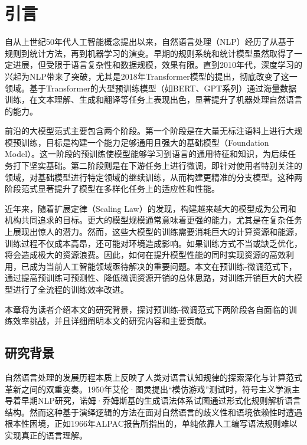 
\chapter{引言}

自从上世纪50年代人工智能概念提出以来，自然语言处理（NLP）经历了从基于规则到统计方法，再到机器学习的演变。早期的规则系统和统计模型虽然取得了一定进展，但受限于语言复杂性和数据规模，效果有限。直到2010年代，深度学习的兴起为NLP带来了突破，尤其是2018年Transformer模型的提出，彻底改变了这一领域。基于Transformer的大型预训练模型（如BERT、GPT系列）通过海量数据训练，在文本理解、生成和翻译等任务上表现出色，显著提升了机器处理自然语言的能力。


前沿的大模型范式主要包含两个阶段。第一个阶段是在大量无标注语料上进行大规模预训练，目标是构建一个能力足够通用且强大的基础模型（Foundation Model）。这一阶段的预训练使模型能够学习到语言的通用特征和知识，为后续任务打下坚实基础。第二阶段则是在下游任务上进行微调，即针对使用者特别关注的领域，对基础模型进行特定领域的继续训练，从而构建更精准的分支模型。这种两阶段范式显著提升了模型在多样化任务上的适应性和性能。

近年来，随着扩展定律（Scaling Law）的发现，构建越来越大的模型成为公司和机构共同追求的目标。更大的模型规模通常意味着更强的能力，尤其是在复杂任务上展现出惊人的潜力。然而，这些大模型的训练需要消耗巨大的计算资源和能源，训练过程不仅成本高昂，还可能对环境造成影响。如果训练方式不当或缺乏优化，将会造成极大的资源浪费。因此，如何在提升模型性能的同时实现资源的高效利用，已成为当前人工智能领域亟待解决的重要问题。本文在预训练-微调范式下，通过提高预训练可预测性、降低微调资源开销的总体思路，对训练开销巨大的大模型进行了全流程的训练效率改进。

本章将为读者介绍本文的研究背景，探讨预训练-微调范式下两阶段各自面临的训练效率挑战，并且详细阐明本文的研究内容和主要贡献。



\section{研究背景}

自然语言处理的发展历程本质上反映了人类对语言认知规律的探索深化与计算范式革新之间的双重变奏。1950年艾伦·图灵提出“模仿游戏”测试时，符号主义学派主导着早期NLP研究，诺姆·乔姆斯基的生成语法体系试图通过形式化规则解析语言结构。然而这种基于演绎逻辑的方法在面对自然语言的歧义性和语境依赖性时遭遇根本性困境，正如1966年ALPAC报告所指出的，单纯依靠人工编写语法规则难以实现真正的语言理解。

